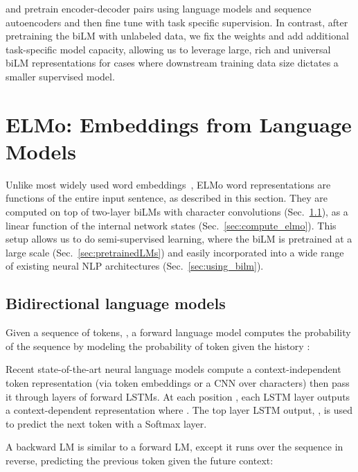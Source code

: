 \documentclass[11pt,a4paper]{article}
\newcommand{\ELMO}{ELMo}
\begin{document}
\citet{Dai2015SemisupervisedSL} and \citet{Ramachandran2017ImproveSeq2SeqLMGal2016ATG} pretrain encoder-decoder pairs
using language models and sequence autoencoders 
and then fine tune with task specific supervision.
In contrast, after pretraining the biLM with unlabeled data, we fix the weights and add additional task-specific model capacity, allowing us to leverage large, rich and universal biLM representations for cases where downstream training data size dictates a smaller supervised model.







\section{\ELMO: Embeddings from Language Models}
\label{sec:elmo}

Unlike most widely used word embeddings~\citep{Pennington2014GloveGV}, \ELMO{} word representations are functions of the entire input sentence, as described in this section. They are computed on top of two-layer biLMs with character convolutions (Sec.~\ref{sec:bilm_def}), as a linear function of the internal network states (Sec.~\ref{sec:compute_elmo}). This setup allows us to do semi-supervised learning, where the biLM is pretrained at a large scale (Sec.~\ref{sec:pretrainedLMs}) and easily incorporated into a wide range of existing neural NLP architectures (Sec.~\ref{sec:using_bilm}). 



\subsection{Bidirectional language models}
\label{sec:bilm_def}
Given a sequence of  tokens, , a forward language model computes the probability of the sequence
by modeling the probability of token  given the history :

Recent state-of-the-art neural language models \citep{Jzefowicz2016ExploringTL,Melis2017OnTS,Merity2017RegularizingAO}
compute a context-independent token representation 
(via token embeddings or a CNN over characters) then pass it through  layers of forward LSTMs.
At each position , each LSTM layer outputs a context-dependent representation  where .
The top layer LSTM output, , is used to predict the next token  with a Softmax layer.


A backward LM is similar to a forward LM, except it runs over the sequence in reverse, predicting the previous token given the future context: 
\end{document}
